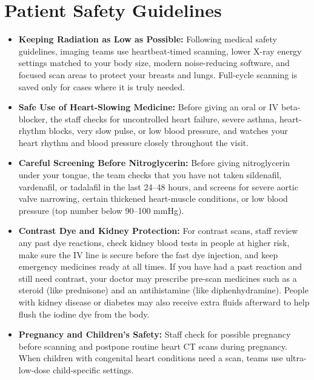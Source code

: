 \section{Patient Safety Guidelines}
\begin{itemize}
    \item \textbf{Keeping Radiation as Low as Possible:} Following medical safety guidelines, imaging teams use heartbeat-timed scanning, lower X-ray energy settings matched to your body size, modern noise-reducing software, and focused scan areas to protect your breasts and lungs. Full-cycle scanning is saved only for cases where it is truly needed.
    \item \textbf{Safe Use of Heart-Slowing Medicine:} Before giving an oral or IV beta-blocker, the staff checks for uncontrolled heart failure, severe asthma, heart-rhythm blocks, very slow pulse, or low blood pressure, and watches your heart rhythm and blood pressure closely throughout the visit.
    \item \textbf{Careful Screening Before Nitroglycerin:} Before giving nitroglycerin under your tongue, the team checks that you have not taken sildenafil, vardenafil, or tadalafil in the last 24--48 hours, and screens for severe aortic valve narrowing, certain thickened heart-muscle conditions, or low blood pressure (top number below 90--100 mmHg).
    \item \textbf{Contrast Dye and Kidney Protection:} For contrast scans, staff review any past dye reactions, check kidney blood tests in people at higher risk, make sure the IV line is secure before the fast dye injection, and keep emergency medicines ready at all times. If you have had a past reaction and still need contrast, your doctor may prescribe pre-scan medicines such as a steroid (like prednisone) and an antihistamine (like diphenhydramine). People with kidney disease or diabetes may also receive extra fluids afterward to help flush the iodine dye from the body.
    \item \textbf{Pregnancy and Children's Safety:} Staff check for possible pregnancy before scanning and postpone routine heart CT scans during pregnancy. When children with congenital heart conditions need a scan, teams use ultra-low-dose child-specific settings.
\end{itemize}

